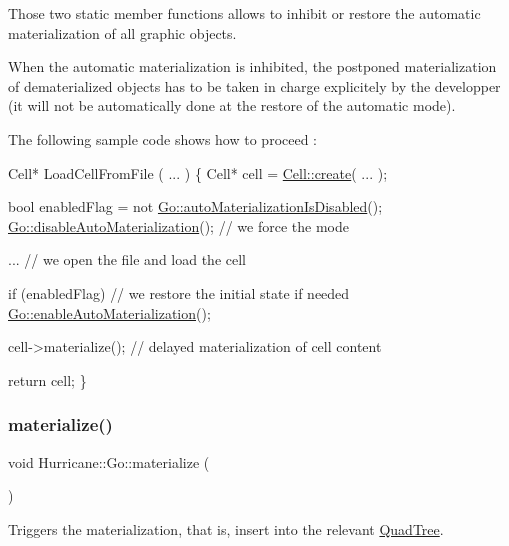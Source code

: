 Those two static member functions allows to inhibit or restore the automatic materialization of all graphic objects.

When the automatic materialization is inhibited, the postponed materialization of dematerialized objects has to be taken in charge explicitely by the developper (it will not be automatically done at the restore of the automatic mode).

The following sample code shows how to proceed \+: 
\begin{DoxyCode}
Cell* LoadCellFromFile ( ... )
\{
   Cell* cell = \mbox{\hyperlink{classHurricane_1_1Cell_ad803afb3e52bea3bf3d520e353b162e0}{Cell::create}}( ... );
 
   \textcolor{keywordtype}{bool} enabledFlag = not \mbox{\hyperlink{classHurricane_1_1Go_a1057be4198a7b64c32a2ac3c7d560014}{Go::autoMaterializationIsDisabled}}();
   \mbox{\hyperlink{classHurricane_1_1Go_a0d49d22a3788e8001e58152e62b9f3cc}{Go::disableAutoMaterialization}}(); \textcolor{comment}{// we force the mode}
 
   ... \textcolor{comment}{// we open the file and load the cell }
 
   \textcolor{keywordflow}{if} (enabledFlag) \textcolor{comment}{// we restore the initial state if needed}
     \mbox{\hyperlink{classHurricane_1_1Go_ab0b1ca3c606247e1ebd7cab8fa828b04}{Go::enableAutoMaterialization}}();
 
   cell->materialize(); \textcolor{comment}{// delayed materialization of cell content}
 
   \textcolor{keywordflow}{return} cell;
\}
\end{DoxyCode}
 \mbox{\label{classHurricane_1_1Go_a8251eba8fabfca57f574921c6c85728f}} 
\subsubsection{\texorpdfstring{materialize()}{materialize()}}
{\footnotesize\ttfamily void Hurricane\+::\+Go\+::materialize (\begin{DoxyParamCaption}{ }\end{DoxyParamCaption})\hspace{0.3cm}{\ttfamily [pure virtual]}}

Triggers the materialization, that is, insert into the relevant \mbox{\hyperlink{classHurricane_1_1QuadTree}{Quad\+Tree}}. \mbox{\label{classHurricane_1_1Go_af79318dc9cbbed85aea1bb8f16eb9724}} 
